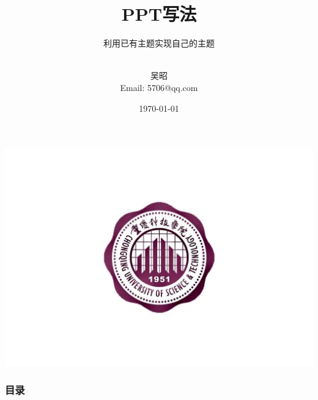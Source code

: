 \documentclass[aspectratio=169, 10pt, utf8, mathserif]{beamer}
\numberwithin{equation}{section} %
\numberwithin{figure}{section} %
\begin{document}
\title[重庆科技学院\quad PPT写法] %
{ \textsc{PPT写法} }
\subtitle{利用已有主题实现自己的主题}
\author[吴昭] %
{\quad\\  \large  吴昭\\ {\scriptsize Email: 5706@qq.com}}
\date{\today}


\begin{frame} %
  \vspace{0.5cm}
  \titlepage
  \includegraphics[width=\paperwidth]{cqust_logo.pdf}
  \hypertarget{beginning}{}
\end{frame}



\begin{frame}
	\frametitle{目录}
	\tableofcontents[hideallsubsections]
\end{frame}
\end{document}
